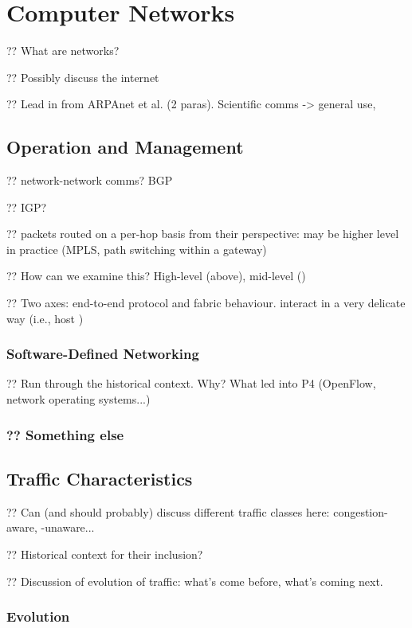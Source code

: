 \chapter{Computer Networks}

?? What are networks?

?? Possibly discuss the internet

?? Lead in from ARPAnet et al. (2 paras). Scientific comms -> general use,

\section{Operation and Management}

?? network-network comms? BGP

?? IGP?

?? packets routed on a per-hop basis from their perspective: may be higher level in practice (MPLS, path switching within a gateway)

?? How can we examine this? High-level (above), mid-level ()

?? Two axes: end-to-end protocol and fabric behaviour. interact in a very delicate way (i.e., host )

\subsection{Software-Defined Networking}

?? Run through the historical context. Why? What led into P4 (OpenFlow, network operating systems...)

\subsection{?? Something else}

\section{Traffic Characteristics}

?? Can (and should probably) discuss different traffic classes here: congestion-aware, -unaware...

?? Historical context for their inclusion?

?? Discussion of evolution of traffic: what's come before, what's coming next.

\subsection{Evolution}

